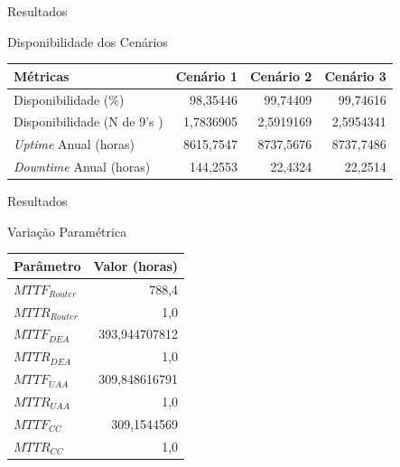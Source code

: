 \documentclass{beamer}
\begin{document}
    \begin{frame}{Resultados}
    
        Disponibilidade dos Cenários
        
        \begin{table}[h]
        \centering
        \begin{tabular}{lrrr}
        \hline
        Métricas                    & \multicolumn{1}{l}{Cenário 1} & \multicolumn{1}{l}{Cenário 2} & \multicolumn{1}{l}{Cenário 3} \\ \hline
        Disponibilidade (\%)        & 98,35446                      & 99,74409                      & 99,74616                      \\
        Disponibilidade (N de 9's ) & 1,7836905                     & 2,5919169                     & 2,5954341                     \\
        \emph{Uptime} Anual (horas)        & 8615,7547                     & 8737,5676                     & 8737,7486                     \\
        \emph{Downtime} Anual (horas)      & 144,2553                      & 22,4324                       & 22,2514                       \\ \hline
            \end{tabular}
        \end{table}

    \end{frame}
    
    \begin{frame}{Resultados}
    
        Variação Paramétrica
        
        \begin{table}[h]
        \centering
        \begin{tabular}{lr}
        \hline
        Parâmetro       & \multicolumn{1}{l}{Valor (horas)} \\ \hline
        $MTTF_{Router}$ & 788,4                             \\
        $MTTR_{Router}$ & 1,0                               \\
        $MTTF_{DEA}$    & 393,944707812                     \\
        $MTTR_{DEA}$    & 1,0                               \\
        $MTTF_{UAA}$    & 309,848616791                     \\
        $MTTR_{UAA}$    & 1,0                               \\
        $MTTF_{CC}$     & 309,1544569                       \\
        $MTTR_{CC}$     & 1,0                               \\ \hline
        \end{tabular}
        \end{table}

    \end{frame}
\end{document}
